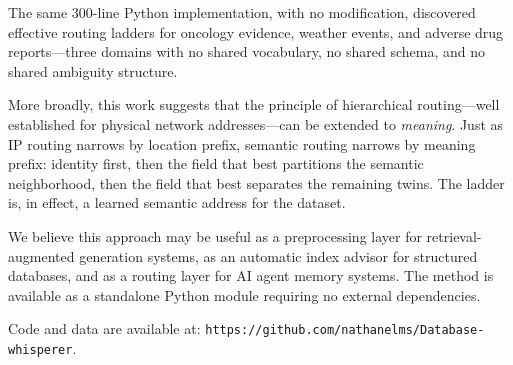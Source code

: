 \documentclass[11pt]{article}
\begin{document}
The same 300-line Python implementation, with no modification, discovered effective routing ladders for oncology evidence, weather events, and adverse drug reports---three domains with no shared vocabulary, no shared schema, and no shared ambiguity structure.

More broadly, this work suggests that the principle of hierarchical routing---well established for physical network addresses---can be extended to \textit{meaning}. Just as IP routing narrows by location prefix, semantic routing narrows by meaning prefix: identity first, then the field that best partitions the semantic neighborhood, then the field that best separates the remaining twins. The ladder is, in effect, a learned semantic address for the dataset.

We believe this approach may be useful as a preprocessing layer for retrieval-augmented generation systems, as an automatic index advisor for structured databases, and as a routing layer for AI agent memory systems. The method is available as a standalone Python module requiring no external dependencies.

Code and data are available at: \texttt{https://github.com/nathanelms/Database-whisperer}.
\end{document}
